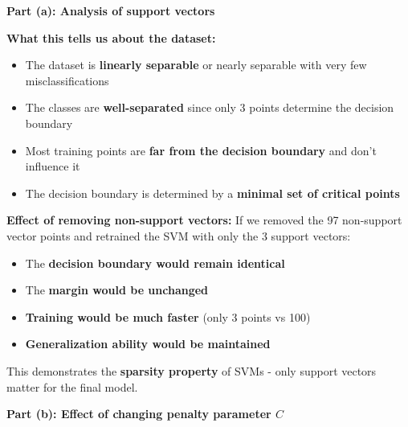 \documentclass{../../common/quals-template}
\begin{document}
\begin{questions}

\begin{solution}
\textbf{Part (a): Analysis of support vectors}

\textbf{What this tells us about the dataset:}
\begin{itemize}
\item The dataset is \textbf{linearly separable} or nearly separable with very few misclassifications
\item The classes are \textbf{well-separated} since only 3 points determine the decision boundary
\item Most training points are \textbf{far from the decision boundary} and don't influence it
\item The decision boundary is determined by a \textbf{minimal set of critical points}
\end{itemize}

\textbf{Effect of removing non-support vectors:}
If we removed the 97 non-support vector points and retrained the SVM with only the 3 support vectors:
\begin{itemize}
\item The \textbf{decision boundary would remain identical}
\item The \textbf{margin would be unchanged}
\item \textbf{Training would be much faster} (only 3 points vs 100)
\item \textbf{Generalization ability would be maintained}
\end{itemize}

This demonstrates the \textbf{sparsity property} of SVMs - only support vectors matter for the final model.

\textbf{Part (b): Effect of changing penalty parameter $C$}


\end{solution}
\end{questions}
\end{document}
